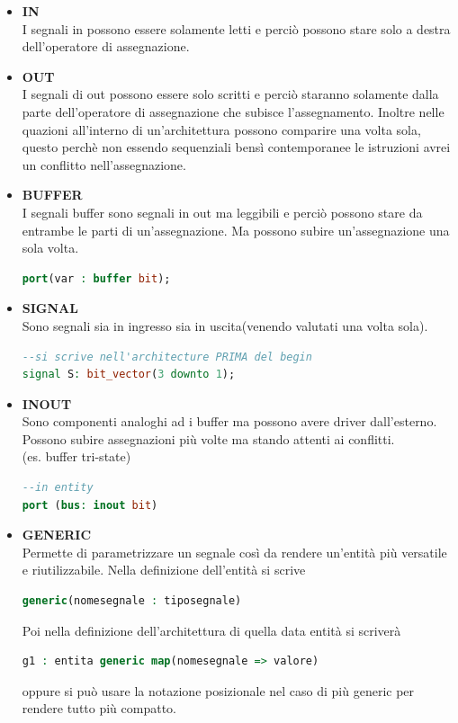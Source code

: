 \documentclass[a4paper]{book}
\begin{document}
\begin{itemize}

\item\textbf{IN}\\
I segnali in possono essere solamente letti e perciò possono stare solo a destra dell'operatore di assegnazione.

\item\textbf{OUT}\\
I segnali di out possono essere solo scritti e perciò staranno solamente dalla parte dell'operatore di assegnazione che subisce l'assegnamento.
Inoltre nelle quazioni all'interno di un'architettura possono comparire una volta sola, questo perchè non essendo sequenziali bensì contemporanee le istruzioni avrei un conflitto nell'assegnazione.

\item\textbf{BUFFER}\\
I segnali buffer sono segnali in out ma leggibili e perciò possono stare da entrambe le parti di un'assegnazione.
Ma possono subire un'assegnazione una sola volta.

\begin{lstlisting}[language=VHDL]
port(var : buffer bit);
\end{lstlisting}

\item\textbf{SIGNAL}\\
Sono segnali sia in ingresso sia in uscita(venendo valutati una volta sola).

\begin{lstlisting}[language=VHDL]
--si scrive nell'architecture PRIMA del begin
signal S: bit_vector(3 downto 1);
\end{lstlisting}

\item\textbf{INOUT}\\
Sono componenti analoghi ad i buffer ma possono avere driver dall'esterno.\\
Possono subire assegnazioni più volte ma stando attenti ai conflitti.\\(es. buffer tri-state)

\begin{lstlisting}[language=VHDL]
--in entity
port (bus: inout bit)
\end{lstlisting}

\item\textbf{GENERIC}\\
Permette di parametrizzare un segnale così da rendere un'entità più versatile e riutilizzabile.
Nella definizione dell'entità si scrive
\begin{lstlisting}[language=VHDL]
generic(nomesegnale : tiposegnale)
\end{lstlisting}
Poi nella definizione dell'architettura di quella data entità si scriverà 
\begin{lstlisting}[language=VHDL]
g1 : entita generic map(nomesegnale => valore)
\end{lstlisting}
oppure si può usare la notazione posizionale nel caso di più generic per rendere tutto più compatto.


\end{itemize}
\end{document}
